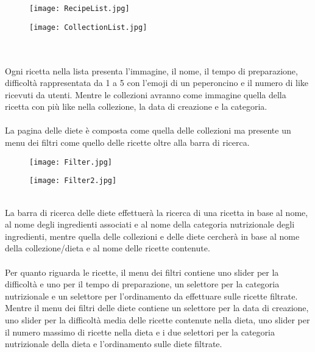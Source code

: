 ﻿\documentclass[a4paper,12pt]{report}
\begin{document}
\begin{figure}[h!]
    \begin{minipage}{.5\textwidth}
        \centering
        \texttt{[image: RecipeList.jpg]}
    \end{minipage}
    \begin{minipage}{.5\textwidth}
        \centering
        \texttt{[image: CollectionList.jpg]}
    \end{minipage}
\end{figure}
\\\\Ogni ricetta nella lista presenta l'immagine, il nome, il tempo di preparazione, difficoltà rappresentata da 1 a 5 con l'emoji di un peperoncino e il numero di like ricevuti da utenti.
Mentre le collezioni avranno come immagine quella della ricetta con più like nella collezione, la data di creazione e la categoria.
\\\\La pagina delle diete è composta come quella delle collezioni ma presente un menu dei filtri come quello delle ricette oltre alla barra di ricerca.
\begin{figure}[h!]
    \begin{minipage}{.5\textwidth}
        \centering
        \texttt{[image: Filter.jpg]}
    \end{minipage}
    \begin{minipage}{.5\textwidth}
        \centering
        \texttt{[image: Filter2.jpg]}
    \end{minipage}
\end{figure}
\\La barra di ricerca delle diete effettuerà la ricerca di una ricetta in base al nome, al nome degli ingredienti associati e al nome della categoria nutrizionale degli ingredienti, mentre quella delle collezioni e delle diete cercherà in base al nome della collezione/dieta e al nome delle ricette contenute.
\\\\Per quanto riguarda le ricette, il menu dei filtri contiene uno slider per la difficoltà e uno per il tempo di preparazione, un selettore per la categoria nutrizionale e un selettore per l'ordinamento da effettuare sulle ricette filtrate.
Mentre il menu dei filtri delle diete contiene un selettore per la data di creazione, uno slider per la difficoltà media delle ricette contenute nella dieta, uno slider per il numero massimo di ricette nella dieta e i due selettori per la categoria nutrizionale della dieta e l'ordinamento sulle diete filtrate.
\end{document}
